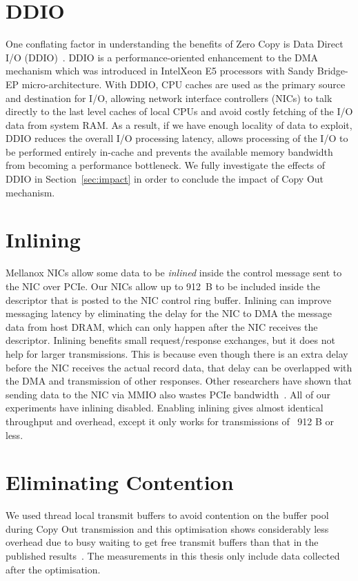 \section{DDIO}
One conflating factor in understanding the benefits of Zero Copy is Data Direct I/O (DDIO)~\cite{ddio}.
 DDIO is a performance-oriented enhancement to the DMA mechanism which was introduced in Intel\textregistered Xeon E5 processors with Sandy Bridge-EP micro-architecture.
 With DDIO, CPU caches are used as the primary source and destination for I/O, 
allowing network interface controllers (NICs) to talk directly to the last level caches of local CPUs
and avoid costly fetching of the I/O data from system RAM. As a result, if we have enough locality of data to exploit,
DDIO reduces the overall I/O processing latency, allows processing of the I/O 
to be performed entirely in-cache and prevents the available memory bandwidth from becoming a performance bottleneck.
We fully investigate the effects of DDIO in Section~\ref{sec:impact} in order to conclude the impact of 
Copy Out mechanism.


\section{Inlining}
Mellanox NICs allow some data to be {\em inlined} inside the control message
sent to the NIC over PCIe. Our NICs allow up to 912~B to be included inside the
descriptor that is posted to the NIC control ring buffer.  Inlining can improve
messaging latency by eliminating the delay for the NIC to DMA the message data
from host DRAM, which can only happen after the NIC receives the descriptor.
Inlining benefits small request/response exchanges, but it does not help for
larger transmissions. This is because even though there is an extra delay
before the NIC receives the actual record data, that delay can be overlapped
with the DMA and transmission of other responses. Other researchers have shown
that sending data to the NIC via MMIO also wastes PCIe bandwidth~\cite{rdma}.
All of our experiments have inlining disabled. Enabling inlining gives almost identical throughput and overhead, except it only
works for transmissions of ~912 B or less.

\section{Eliminating Contention}
We used thread local transmit buffers to avoid contention on the buffer pool during Copy Out transmission and this optimisation shows considerably less 
overhead due to busy waiting to get free transmit buffers than that in the published results~\cite{imdmpaper}. 
The measurements in this thesis only include data collected after the optimisation.

